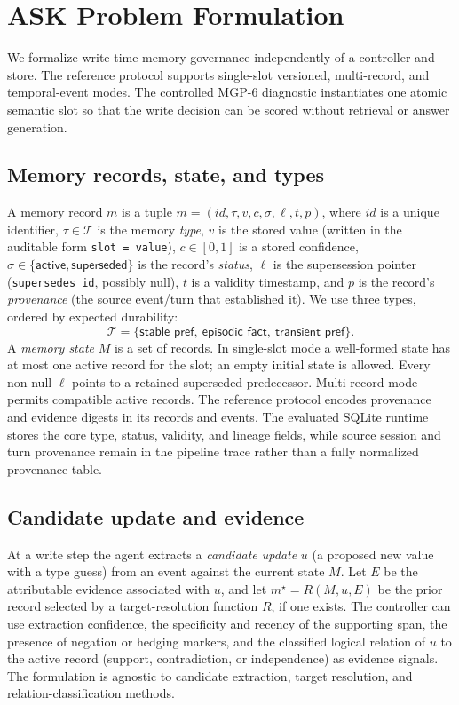 \section{ASK Problem Formulation}
\label{sec:formulation}

We formalize write-time memory governance independently of a controller and
store. The reference protocol supports single-slot versioned, multi-record, and
temporal-event modes. The controlled MGP-6 diagnostic instantiates one atomic
semantic slot so that the write decision can be scored without retrieval or
answer generation.

\subsection{Memory records, state, and types}

A memory record $m$ is a tuple
$m = (\mathit{id}, \tau, v, c, \sigma, \ell, t, p)$, where $\mathit{id}$ is a
unique identifier, $\tau \in \mathcal{T}$ is the memory \emph{type}, $v$ is the
stored value (written in the auditable form \texttt{slot = value}), $c \in [0,1]$
is a stored confidence, $\sigma \in \{\textsf{active}, \textsf{superseded}\}$ is
the record's \emph{status}, $\ell$ is the supersession pointer (\texttt{supersedes\_id},
possibly null), $t$ is a validity timestamp, and $p$ is the record's
\emph{provenance} (the source event/turn that established it). We use three
types, ordered by expected durability:
\[
\mathcal{T} = \{\textsf{stable\_pref},\ \textsf{episodic\_fact},\ \textsf{transient\_pref}\}.
\]
A \emph{memory state} $M$ is a set of records. In single-slot mode a well-formed
state has at most one active record for the slot; an empty initial state is
allowed. Every non-null $\ell$ points to a retained superseded predecessor.
Multi-record mode permits compatible active records. The reference protocol
encodes provenance and evidence digests in its records and events. The evaluated
SQLite runtime stores the core type, status, validity, and lineage fields, while
source session and turn provenance remain in the pipeline trace rather than a
fully normalized provenance table.

\subsection{Candidate update and evidence}

At a write step the agent extracts a \emph{candidate update} $u$ (a proposed new
value with a type guess) from an event against the current state $M$. Let $E$
be the attributable evidence associated with $u$, and let
$m^{\star}=R(M,u,E)$ be the prior record selected by a target-resolution
function $R$, if one exists. The controller can use
extraction confidence, the specificity and recency of the supporting span, the
presence of negation or hedging markers, and the classified logical relation of
$u$ to the active record (support, contradiction, or independence) as evidence
signals. The formulation is agnostic to candidate extraction, target resolution,
and relation-classification methods.

